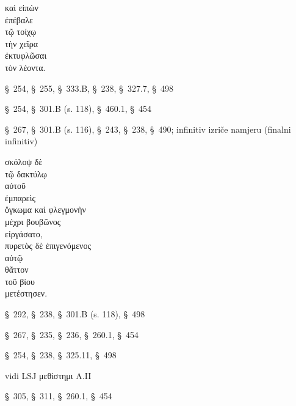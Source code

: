 

{\large
\begin{greek}
\noindent καὶ εἰπὼν \\
ἐπέβαλε \\
\tabto{2em} τῷ τοίχῳ \\
\tabto{2em} τὴν χεῖρα \\
\tabto{2em} ἐκτυφλῶσαι \\
\tabto{4em} τὸν λέοντα.\\

\end{greek}
}

\begin{description}[noitemsep]
\item[εἰπὼν] §~254, §~255, §~333.B, §~238, §~327.7, §~498
\item[ἐπέβαλε] §~254, §~301.B (s. 118), §~460.1, §~454
\item[ἐκτυφλῶσαι] §~267, §~301.B (s. 116), §~243, §~238, §~490; infinitiv izriče namjeru (finalni infinitiv)%
\end{description}



{\large
\begin{greek}
\noindent σκόλοψ δὲ \\
\tabto{2em} τῷ δακτύλῳ \\
\tabto{4em} αὐτοῦ \\
ἐμπαρεὶς \\
ὄγκωμα καὶ φλεγμονὴν \\
\tabto{2em} μέχρι βουβῶνος \\
εἰργάσατο, \\
πυρετὸς δὲ ἐπιγενόμενος \\
\tabto{2em} αὐτῷ \\
θᾶττον \\
\tabto{2em} τοῦ βίου \\
μετέστησεν.\\

\end{greek}
}
\noclub
\begin{description}[noitemsep,topsep=0.5pt]
\item[ἐμπαρεὶς] §~292, §~238, §~301.B (s. 118), §~498
\item[εἰργάσατο] §~267, §~235, §~236, §~260.1, §~454
\item[ἐπιγενόμενος] §~254, §~238, §~325.11, §~498
\item[τοῦ βίου μετέστησεν] vidi LSJ μεθίστημι A.II
\item[μετέστησεν] §~305, §~311, §~260.1, §~454

\end{description}


